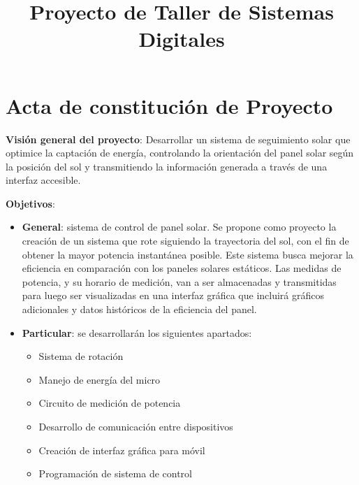 \documentclass[a4paper,12pt]{article}
\begin{document}
\title{Proyecto de Taller de Sistemas Digitales}
\author{}
\date{}
\maketitle

\tableofcontents
\newpage

\section{Acta de constitución de Proyecto}

\textbf{Visión general del proyecto}: Desarrollar un sistema de seguimiento solar que optimice la captación de energía, controlando la orientación del panel solar según la posición del sol y transmitiendo la información generada a través de una interfaz accesible.

\textbf{Objetivos}: 
\begin{itemize}
    \item \textbf{General}: sistema de control de panel solar. Se propone como proyecto la creación de un sistema que rote siguiendo la trayectoria del sol, con el fin de obtener la mayor potencia instantánea posible. Este sistema busca mejorar la eficiencia en comparación con los paneles solares estáticos. Las medidas de potencia, y su horario de medición, van a ser almacenadas y transmitidas para luego ser visualizadas en una interfaz gráfica que incluirá gráficos adicionales y datos históricos de la eficiencia del panel.
    \item \textbf{Particular}: se desarrollarán los siguientes apartados:
    \begin{itemize}
        \item Sistema de rotación
        \item Manejo de energía del micro
        \item Circuito de medición de potencia
        \item Desarrollo de comunicación entre dispositivos
        \item Creación de interfaz gráfica para móvil
        \item Programación de sistema de control
    \end{itemize}
\end{itemize}
\end{document}
